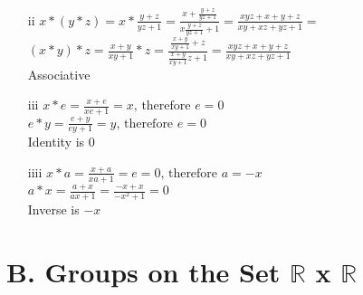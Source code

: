 \begin{enumerate}
\begin{enumerate}
\item[ii]
$x*(y*z)=x*\frac{y+z}{yz+1}=\frac{x+\frac{y+z}{yz+1}}{x\frac{y+z}{yz+1}+1}=\frac{x y z + x + y + z}{x y + x z + y z + 1}=$ \\
$(x*y)*z=\frac{x+y}{xy+1}*z=\frac{\frac{x+y}{xy+1}+z}{\frac{x+y}{xy+1}z+1}=\frac{x y z + x + y + z}{x y + x z + y z + 1}$ \\
Associative

\item[iii]
$x*e=\frac{x+e}{xe+1}=x \text{, therefore } e=0$ \\
$e*y=\frac{e+y}{ey+1}=y \text{, therefore } e=0$ \\
Identity is $0$

\item[iiii]
$x*a=\frac{x+a}{xa+1}=e=0 \text{, therefore } a=-x$ \\
$a*x=\frac{a+x}{ax+1}=\frac{-x+x}{-x^2+1}=0$ \\
Inverse is $-x$

\end{enumerate}

\end{enumerate}

\section*{B. Groups on the Set $\mathbb{R}$ x $\mathbb{R}$}

